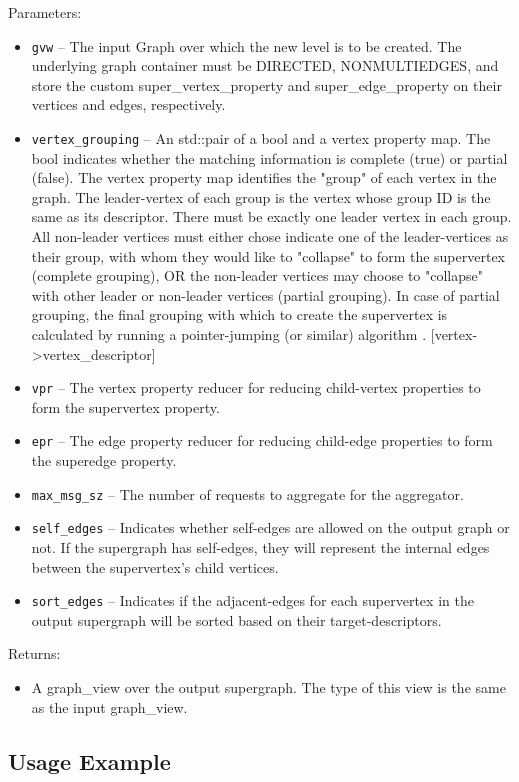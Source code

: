 Parameters:
\begin{itemize}
\item
\texttt{gvw} --
The input Graph over which the new level is to be created. The underlying graph container must be DIRECTED, NONMULTIEDGES, and store the custom super\_vertex\_property and super\_edge\_property on their vertices and edges, respectively.
\item
\texttt{vertex\_grouping} --
An std::pair of a bool and a vertex property map. The bool indicates whether the matching information is complete (true) or partial (false). The vertex property map identifies the "group" of each vertex in the graph. The leader-vertex of each group is the vertex whose group ID is the same as its descriptor. There must be exactly one leader vertex in each group. All non-leader vertices must either chose indicate one of the leader-vertices as their group, with whom they would like to "collapse" to form the supervertex (complete grouping), OR the non-leader vertices may choose to "collapse" with other leader or non-leader vertices (partial grouping). In case of partial grouping, the final grouping with which to create the supervertex is calculated by running a pointer-jumping (or similar) algorithm . [vertex->vertex\_descriptor]
\item
\texttt{vpr} --
The vertex property reducer for reducing child-vertex properties to form the supervertex property.
\item
\texttt{epr} --
The edge property reducer for reducing child-edge properties to form the superedge property.
\item
\texttt{max\_msg\_sz} --
The number of requests to aggregate for the aggregator.
\item
\texttt{self\_edges} --
Indicates whether self-edges are allowed on the output graph or not. If the supergraph has self-edges, they will represent the internal edges between the supervertex's child vertices.
\item
\texttt{sort\_edges} --
Indicates if the adjacent-edges for each supervertex in the output supergraph will be sorted based on their target-descriptors.
\end{itemize}

Returns:
\begin{itemize}
\item
A graph\_view over the output supergraph. The type of this view is the same as the input graph\_view. 
\end{itemize}

\subsection{Usage Example} \label{sec-create-level-all-alg-use}

